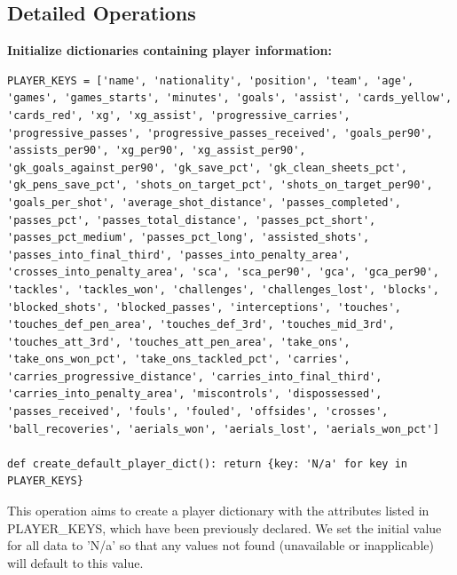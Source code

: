 \documentclass[12pt]{report}
\begin{document}
{\subsection{Detailed Operations} %
\textbf*{Initialize dictionaries containing player information:} %
\begin{lstlisting}
PLAYER_KEYS = ['name', 'nationality', 'position', 'team', 'age', 'games', 'games_starts', 'minutes', 'goals', 'assist', 'cards_yellow', 'cards_red', 'xg', 'xg_assist', 'progressive_carries', 'progressive_passes', 'progressive_passes_received', 'goals_per90', 'assists_per90', 'xg_per90', 'xg_assist_per90', 'gk_goals_against_per90', 'gk_save_pct', 'gk_clean_sheets_pct', 'gk_pens_save_pct', 'shots_on_target_pct', 'shots_on_target_per90', 'goals_per_shot', 'average_shot_distance', 'passes_completed', 'passes_pct', 'passes_total_distance', 'passes_pct_short', 'passes_pct_medium', 'passes_pct_long', 'assisted_shots', 'passes_into_final_third', 'passes_into_penalty_area', 'crosses_into_penalty_area', 'sca', 'sca_per90', 'gca', 'gca_per90', 'tackles', 'tackles_won', 'challenges', 'challenges_lost', 'blocks', 'blocked_shots', 'blocked_passes', 'interceptions', 'touches', 'touches_def_pen_area', 'touches_def_3rd', 'touches_mid_3rd', 'touches_att_3rd', 'touches_att_pen_area', 'take_ons', 'take_ons_won_pct', 'take_ons_tackled_pct', 'carries', 'carries_progressive_distance', 'carries_into_final_third',
'carries_into_penalty_area', 'miscontrols', 'dispossessed', 'passes_received', 'fouls', 'fouled', 'offsides', 'crosses', 'ball_recoveries', 'aerials_won', 'aerials_lost', 'aerials_won_pct']

def create_default_player_dict(): return {key: 'N/a' for key in PLAYER_KEYS}

\end{lstlisting}
This operation aims to create a player dictionary with the attributes listed in PLAYER\_KEYS, which have been previously declared. We set the initial value for all data to 'N/a' so that any values not found (unavailable or inapplicable) will default to this value.

}
\end{document}
